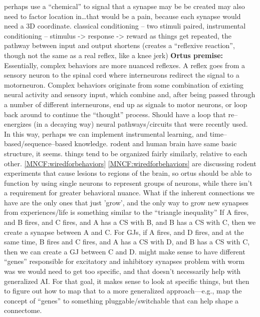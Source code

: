 \documentclass[11pt, a4paper, oneside]{article}   	%
\begin{document}
\begin{outline}
\point perhaps use a ``chemical'' to signal that a synapse may be be created
\point may also need to factor location in\ldots that would be a pain, because each synapse would need a 3D coordinate.
\point classical conditioning -- two stimuli paired, instrumental conditioning -- stimulus -> response -> reward
\point as things get repeated, the pathway between input and output shortens (creates a ``reflexive reaction'', though not the same as a real reflex, like a knee jerk)
  \subpoint \textbf{Ortus premise:} Essentially, complex behaviors are more nuanced reflexes. A reflex goes from a sensory neuron to the spinal cord where interneurons redirect the signal to a motorneuron. Complex behaviors originate from some combination of existing neural activity and sensory input, which combine and, after being passed through a number of different interneurons, end up as signals to motor neurons, or loop back around to continue the ``thought'' process.
\point Should have a loop that re--energizes (in a decaying way) neural pathways/circuits that were recently used. In this way, perhaps we can implement instrumental learning, and time--based/sequence--based knowledge.
\point rodent and human brain have same basic structure, it seems. things tend to be organized fairly similarly, relative to each other. \ref{MNCF:wiredforbehaviors}
\point \ref{MNCF:wiredforbehaviors} are discussing rodent experiments that cause lesions to regions of the brain, so ortus should be able to function by using single neurons to represent groups of neurons, while there isn't a requirement for greater behavioral nuance.
\point What if the inherent connections we have are the only ones that just 'grow', and the only way to grow new synapses from experiences/life is something similar to the ``triangle inequality''
    \subpoint If A fires, and B fires, and C fires, and A has a CS with B, and B has a CS with C, then we create a synapse between A and C.
    \subpoint For GJs, if A fires, and D fires, and at the same time, B fires and C fires, and A has a CS with D, and B has a CS with C, then we can create a GJ between C and D.
\point might make sense to have different ``genes'' responsible for excitatory and inhibitory synapses
\point problem with worm was we would need to get too specific, and that doesn't necessarily help with generalized AI. For that goal, it makes sense to look at specific things, but then to figure out how to map that to a more generalized approach---e.g., map the concept of ``genes'' to something pluggable/switchable that can help shape a connectome.

\end{outline}
\end{document}
